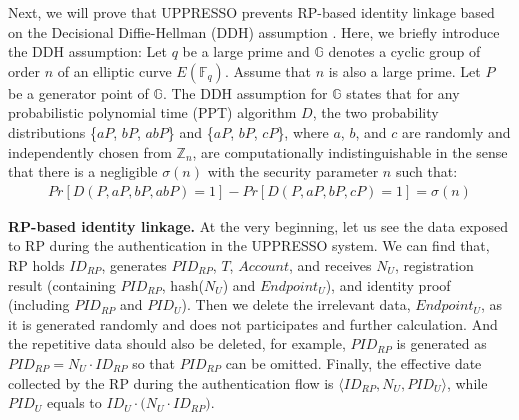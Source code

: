 Next, we will prove that UPPRESSO prevents RP-based identity linkage based on the Decisional Diffie-Hellman (DDH) assumption \cite{GoldwasserK16}. Here, we briefly introduce the DDH assumption:
Let $q$ be a large prime and $\mathbb{G}$ denotes a cyclic group of order $n$ of an elliptic curve $E(\mathbb{F}_q)$.
Assume that $n$ is also a large prime. Let $P$ be a generator point of $\mathbb{G}$. The DDH assumption for $\mathbb{G}$ states that for any probabilistic polynomial time (PPT) algorithm $D$, the two probability distributions \{$aP$, $bP$, $abP$\} and \{$aP$, $bP$, $cP$\}, where $a$, $b$, and $c$ are randomly and independently chosen from $\mathbb{Z}_n$, are computationally indistinguishable in the sense that there is a negligible $\sigma(n)$ with the security parameter $n$ such that:
\vspace{-\topsep}
\begin{multline*}
Pr[D(P, aP, bP, abP)=1]-Pr[D(P, aP, bP, cP)=1]=\sigma(n)
\end{multline*}
\vspace{-\topsep}

\vspace{-2mm}
\noindent\textbf{RP-based identity linkage.}
At the very beginning, let us see the data exposed to RP during the authentication in the UPPRESSO system. 
We can find that, RP holds $ID_{RP}$,  generates $PID_{RP}$, $T$, $Account$, and receives $N_U$, registration result (containing $PID_{RP}$, hash($N_U$) and $Endpoint_U$), and identity proof (including $PID_{RP}$ and $PID_U$). Then we delete the irrelevant data, $Endpoint_U$, as it is generated randomly and does not participates and further calculation. And the repetitive data should also be deleted, for example, $PID_{RP}$ is generated as $PID_{RP}=N_U \cdot {ID_{RP}}$ so that $PID_{RP}$ can be omitted. Finally, the effective date collected by the RP during the authentication flow is $\langle ID_{RP}, N_U, PID_U\rangle$, while $PID_U$ equals to $ID_U \cdot{(N_U \cdot {ID_{RP})}}$. 

